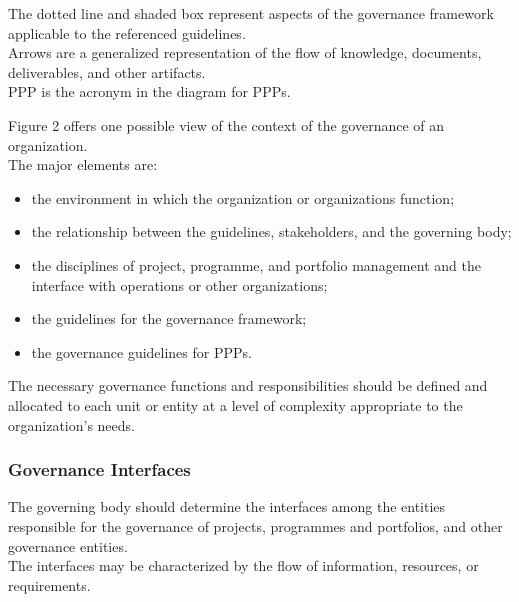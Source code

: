 \documentclass[letterpaper,10pt,english]{jupyterBook}
\begin{document}
\sphinxAtStartPar
The dotted line and shaded box represent aspects of the governance framework applicable to the referenced
guidelines. \\
Arrows are a generalized representation of the flow of knowledge, documents, deliverables, and other
artifacts. \\
PPP is the acronym in the diagram for PPPs.

\sphinxAtStartPar
Figure 2 offers one possible view of the context of the governance of an organization. \\
The major elements are:
\begin{itemize}
\item {} 
\sphinxAtStartPar
the environment in which the organization or organizations function;

\item {} 
\sphinxAtStartPar
the relationship between the guidelines, stakeholders, and the governing body;

\item {} 
\sphinxAtStartPar
the disciplines of project, programme, and portfolio management and the interface with operations or other organizations;

\item {} 
\sphinxAtStartPar
the guidelines for the governance framework;

\item {} 
\sphinxAtStartPar
the governance guidelines for PPPs.

\end{itemize}

\sphinxAtStartPar
The necessary governance functions and responsibilities should be defined and allocated to each unit or entity at a level of complexity appropriate to the organization’s needs.


\subsubsection{Governance Interfaces}
\label{\detokenize{PM/ppm:governance-interfaces}}
\sphinxAtStartPar
The governing body should determine the interfaces among the entities responsible for the governance of projects, programmes and portfolios, and other governance entities. \\
The interfaces may be characterized by the flow of information, resources, or requirements.
\end{document}

